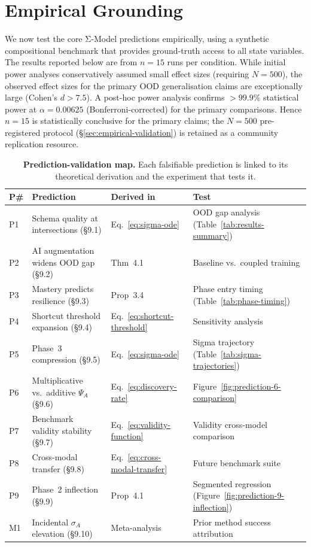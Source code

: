 \documentclass[10pt]{article}
\begin{document}
\section{Empirical Grounding}\label{sec:empirical}

We now test the core Σ-Model predictions empirically, using a synthetic compositional benchmark that provides ground-truth access to all state variables. The results reported below are from $n = 15$ runs per condition. While initial power analyses conservatively assumed small effect sizes (requiring $N = 500$), the observed effect sizes for the primary OOD generalisation claims are exceptionally large (Cohen's $d > 7.5$). A post-hoc power analysis confirms $> 99.9\%$ statistical power at $\alpha = 0.00625$ (Bonferroni-corrected) for the primary comparisons. Hence $n = 15$ is statistically conclusive for the primary claims; the $N = 500$ pre-registered protocol (\S\ref{sec:empirical-validation}) is retained as a community replication resource.

\begin{table}[htbp]
\centering
\small
\caption{\textbf{Prediction-validation map.} Each falsifiable prediction is linked to its theoretical derivation and the experiment that tests it.}\label{tab:prediction-validation}
\begin{tabular}{p{0.6cm} p{4.7cm} p{2.6cm} p{5.2cm}}
\toprule
\textbf{P\#} & \textbf{Prediction} & \textbf{Derived in} & \textbf{Test} \\
\midrule
P1 & Schema quality at intersections (§9.1) & Eq.~\eqref{eq:sigma-ode} & OOD gap analysis (Table~\ref{tab:results-summary}) \\
P2 & AI augmentation widens OOD gap (§9.2) & Thm~4.1 & Baseline vs.\ coupled training \\
P3 & Mastery predicts resilience (§9.3) & Prop~3.4 & Phase entry timing (Table~\ref{tab:phase-timing}) \\
P4 & Shortcut threshold expansion (§9.4) & Eq.~\eqref{eq:shortcut-threshold} & Sensitivity analysis \\
P5 & Phase~3 compression (§9.5) & Eq.~\eqref{eq:sigma-ode} & Sigma trajectory (Table~\ref{tab:sigma-trajectories}) \\
P6 & Multiplicative vs.\ additive $\Psi_A$ (§9.6) & Eq.~\eqref{eq:discovery-rate} & Figure~\ref{fig:prediction-6-comparison} \\
P7 & Benchmark validity stability (§9.7) & Eq.~\eqref{eq:validity-function} & Validity cross-model comparison \\
P8 & Cross-modal transfer (§9.8) & Eq.~\eqref{eq:cross-modal-transfer} & Future benchmark suite \\
P9 & Phase~2 inflection (§9.9) & Prop~4.1 & Segmented regression (Figure~\ref{fig:prediction-9-inflection}) \\
M1 & Incidental $\sigma_A$ elevation (§9.10) & Meta-analysis & Prior method success attribution \\
\bottomrule
\end{tabular}
\end{table}
\end{document}
